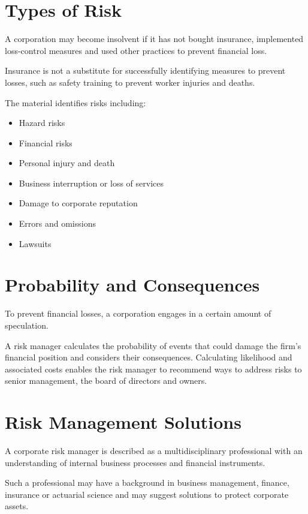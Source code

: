 \documentclass[
]{book}
\providecommand{\tightlist}{%
  \setlength{\itemsep}{0pt}\setlength{\parskip}{0pt}}
\begin{document}
\section{Types of Risk}\label{types-of-risk}

A corporation may become insolvent if it has not bought insurance, implemented loss-control measures and used other practices to prevent financial loss.

Insurance is not a substitute for successfully identifying measures to prevent losses, such as safety training to prevent worker injuries and deaths.

The material identifies risks including:

\begin{itemize}
\tightlist
\item
  Hazard risks
\item
  Financial risks
\item
  Personal injury and death
\item
  Business interruption or loss of services
\item
  Damage to corporate reputation
\item
  Errors and omissions
\item
  Lawsuits
\end{itemize}

\section{Probability and Consequences}\label{probability-and-consequences}

To prevent financial losses, a corporation engages in a certain amount of speculation.

A risk manager calculates the probability of events that could damage the firm's financial position and considers their consequences. Calculating likelihood and associated costs enables the risk manager to recommend ways to address risks to senior management, the board of directors and owners.

\section{Risk Management Solutions}\label{risk-management-solutions}

A corporate risk manager is described as a multidisciplinary professional with an understanding of internal business processes and financial instruments.

Such a professional may have a background in business management, finance, insurance or actuarial science and may suggest solutions to protect corporate assets.
\end{document}

